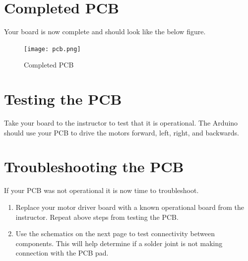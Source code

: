 \documentclass{handout}
\begin{document}
	\section{Completed PCB}
	Your board is now complete and should look like the below figure.
	\begin{figure} [H]
		\centering
		\texttt{[image: pcb.png]}
		\caption{Completed PCB}
	\end{figure}

	\section{Testing the PCB}
	Take your board to the instructor to test that it is operational. The Arduino should use your PCB to drive the motors forward, left, right, and backwards.
	
	\section{Troubleshooting the PCB}
	If your PCB was not operational it is now time to troubleshoot. 
	\begin{enumerate}
		\item Replace your motor driver board with a known operational board from the instructor. Repeat above steps from testing the PCB.
		\item Use the schematics on the next page to test connectivity between components. This will help determine if a solder joint is not making connection with the PCB pad.
	\end{enumerate}
\end{document}
